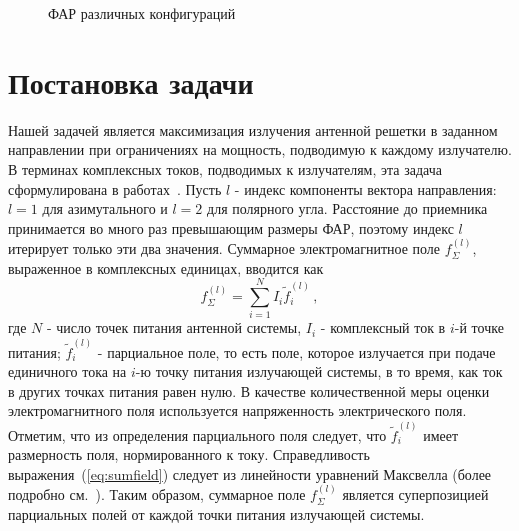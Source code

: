 \begin{figure}
    \begin{minipage}[h]{0.49\linewidth}
    \end{minipage}
    \hfill
    \begin{minipage}[h]{0.49\linewidth}
    \end{minipage}
    \begin{minipage}[h]{0.49\linewidth}
    \end{minipage}
    \hfill
    \begin{minipage}[h]{0.49\linewidth}
    \end{minipage}
    \caption{ФАР различных конфигураций}
    \label{ris:bve_bvd}
\end{figure}


\section{Постановка задачи}\label{sec:statement}

Нашей задачей является максимизация излучения антенной решетки в заданном направлении при ограничениях на мощность, подводимую к каждому
излучателю. В терминах комплексных токов, подводимых к излучателям, эта задача сформулирована в работах~\cite{yurkov:farkv,yurkov:knd}.
Пусть $l$ - индекс компоненты вектора направления: $l=1$ для азимутального и $l=2$ для полярного угла. Расстояние до приемника принимается во много раз превышающим размеры ФАР, поэтому индекс $l$ итерирует только эти два значения.
Суммарное электромагнитное поле $f^{(l)}_{\Sigma}$, выраженное в комплексных единицах, вводится как
%
\begin{equation}
    f^{(l)}_{\Sigma} = \sum_{i=1}^{N}I_i \tilde{f}_i^{(l)} \, ,
    \label{eq:sumfield}
\end{equation}
%
где $N$ - число точек питания антенной системы, $I_i$ - комплексный ток в $i$-й точке питания; $\tilde{f}_i^{(l)}$ - парциальное поле, то есть поле, которое излучается при подаче единичного тока на $i$-ю точку питания излучающей системы, в то время, как ток в других точках питания равен нулю. В качестве количественной меры оценки электромагнитного поля используется напряженность электрического поля. Отметим, что из определения парциального поля следует, что $\tilde{f}_i^{(l)}$ имеет размерность поля, нормированного к току. Справедливость выражения~(\ref{eq:sumfield}) следует из линейности уравнений Максвелла (более подробно см.~\cite{yurkov:farkv}). Таким образом, суммарное поле $f^{(l)}_{\Sigma}$ является суперпозицией парциальных полей от каждой точки питания излучающей системы.

